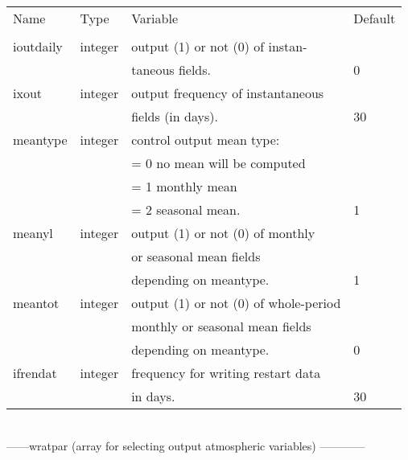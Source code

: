 \begin{tabular}{llll}
\\
Name	 &   Type&	Variable			&	Default    \\
\\
\hline
ioutdaily&   integer&	output (1) or not (0) of instan-   &               \\
	&           &	taneous fields.			&	0          \\
ixout	&    integer&	output frequency of instantaneous                  \\
	&	    &	fields (in days).	        &	30         \\
meantype &   integer&	control output mean type:                          \\
	 &	    &	= 0 no mean will be computed                       \\
	 &	    &   = 1 monthly mean                                   \\
	 &          &	= 2 seasonal mean.      	&	1          \\
meanyl	 &   integer&	output (1) or not (0) of monthly                   \\
	 &	    &	or seasonal mean fields                            \\
	 &          &	depending on meantype.		&	1          \\	
meantot	 &   integer&	output (1) or not (0) of whole-period              \\
	 &	    &	monthly or seasonal mean fields                    \\
	 &	    &	depending on meantype.	 	&	0          \\
ifrendat &   integer&	frequency for writing restart data                 \\
	 &	    &   in days.			&	30         \\  \hline
\end{tabular}
\\
\newpage
------wratpar  (array for selecting output atmospheric variables)  ------------          \\
\\
